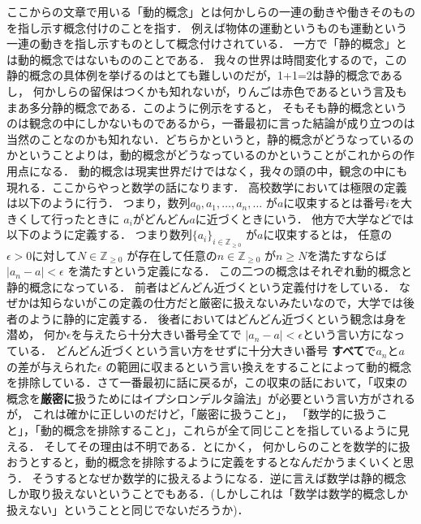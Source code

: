 \documentclass[leqno, 12pt]{jsarticle}
\newcommand{\zz}{\mathbb{Z}}
\begin{document}
ここからの文章で用いる「動的概念」とは何かしらの一連の動きや働きそのものを指し示す概念付けのことを指す．
例えば物体の運動というものも運動という一連の動きを指し示すものとして概念付けされている．
一方で「静的概念」とは動的概念ではないもののことである．
我々の世界は時間変化するので，この静的概念の具体例を挙げるのはとても難しいのだが，1+1=2は静的概念であるし，
何かしらの留保はつくかも知れないが，りんごは赤色であるという言及もまあ多分静的概念である．このように例示をすると，
そもそも静的概念というのは観念の中にしかないものであるから，一番最初に言った結論が成り立つのは当然のことなのかも知れない．どちらかというと，静的概念がどうなっているのかということよりは，動的概念がどうなっているのかということがこれからの作用点になる．
動的概念は現実世界だけではなく，我々の頭の中，観念の中にも現れる．ここからやっと数学の話になります．
高校数学においては極限の定義は以下のように行う．
つまり，数列$a_{0}, a_{1}, \dots, a_{n}, \dots$
が$a$に収束するとは番号$i$を大きくして行ったときに
$a_{i}$がどんどん$a$に近づくときにいう．
他方で大学などでは以下のように定義する．
つまり数列$\{a_{i}\}_{i\in \zz_{\ge 0}}$
が$a$に収束するとは，
任意の$\epsilon>0$に対して$N\in \zz_{\ge 0}$
が存在して任意の$n\in \zz_{\ge 0}$
が$n\ge N$を満たすならば
$|a_{n}-a|<\epsilon$
を満たすという定義になる．
この二つの概念はそれぞれ動的概念と静的概念になっている．
前者はどんどん近づくという定義付けをしている．
なぜかは知らないがこの定義の仕方だと厳密に扱えないみたいなので，大学では後者のように静的に定義する．
後者においてはどんどん近づくという観念は身を潜め，
何か$\epsilon$を与えたら十分大きい番号全てで
$|a_{n}-a|<\epsilon$という言い方になっている．
どんどん近づくという言い方をせずに十分大きい番号
\textbf{すべて}で$a_{n}$と$a$の差が与えられた$\epsilon$
の範囲に収まるという言い換えをすることによって動的概念を排除している．さて一番最初に話に戻るが，この収束の話において，「収束の概念を\textbf{厳密に}扱うためにはイプシロンデルタ論法」が必要という言い方がされるが，
これは確かに正しいのだけど，「厳密に扱うこと」，
「数学的に扱うこと」，「動的概念を排除すること」，これらが全て同じことを指しているように見える．
そしてその理由は不明である．とにかく，
何かしらのことを数学的に扱おうとすると，動的概念を排除するように定義をするとなんだかうまくいくと思う．
そうするとなぜか数学的に扱えるようになる．逆に言えば数学は静的概念しか取り扱えないということでもある．(しかしこれは「数学は数学的概念しか扱えない」ということと同じでないだろうか)．
\end{document}
